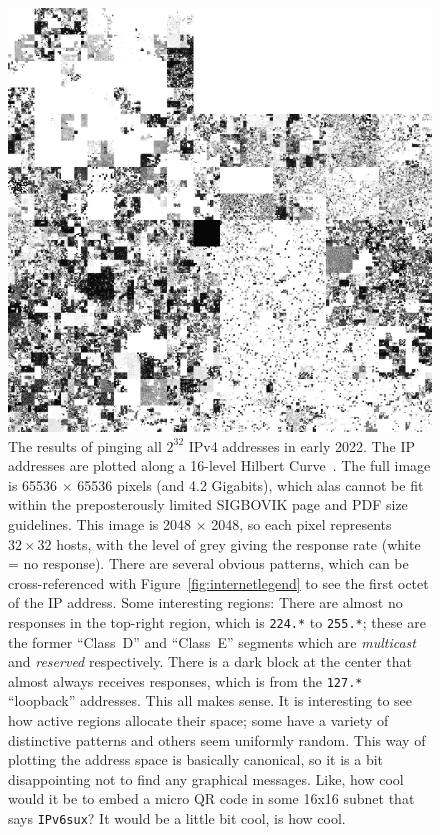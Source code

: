 \documentclass[twocolumn]{article}
\begin{document}
\begin{figure}[tp]
\includegraphics[width=\textwidth]{internet}
\caption{ The results of pinging all $2^{32}$ IPv4 addresses in early
  2022. The IP addresses are plotted along a 16-level Hilbert
  Curve~\cite{hilbert1891ueber}. The full image is 65536 $\times$ 65536
  pixels (and 4.2 Gigabits), which alas cannot be fit within the
  preposterously limited SIGBOVIK page and PDF size guidelines. This
  image is 2048 $\times$ 2048, so each pixel represents $32 \times 32$
  hosts, with the level of grey giving the response rate (white = no
  response). There are several obvious patterns, which can be
  cross-referenced with Figure~\ref{fig:internetlegend} to see the
  first octet of the IP address. Some interesting regions: There are
  almost no responses in the top-right region, which is {\tt 224.*} to
  {\tt 255.*}; these are the former ``Class~D'' and ``Class~E''
  segments which are {\it multicast} and {\it reserved} respectively.
  There is a dark block at the center that almost always receives
  responses, which is from the {\tt 127.*} ``loopback'' addresses. This
  all makes sense. It is interesting to see how active regions allocate
  their space; some have a variety of distinctive patterns and others
  seem uniformly random.
%
  This way of plotting the address space is basically canonical, so it
  is a bit disappointing not to find any graphical messages. Like,
  how cool would it be to embed a micro QR code in some 16x16 subnet
  that says {\tt IPv6sux}? It would be a little bit cool, is how cool.
} \label{fig:internet}
\end{figure}
\end{document}
